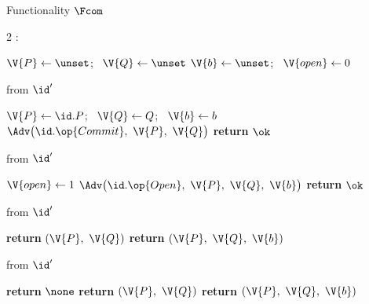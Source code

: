 \begin{interface}[nofloat]{Functionality $\Fcom$ \\
\params{$\PID$, \quad $\Ps$, \quad $\admits$, \quad
$\uses := \{(\Adv,\serves)\}$, \quad $\pars := \none$}}

{\scriptsize
\setlength{\columnsep}{1.4em}
\begin{multicols}{2}
:
\begin{algorithmic}[1]
\setcounter{contline}{0}\algcont
\State $\V{P} \gets \unset$; \ $\V{Q} \gets \unset$
\State $\V{b} \gets \unset$; \ $\V{open} \gets 0$
\algsave
\end{algorithmic}
\vspace{1.4ex}

 \quad from $\id'$
\begin{algorithmic}[1]
\algcont
{} \label{ln:comonce}
\State $\V{P} \gets \id.P$; \ $\V{Q} \gets Q$; \ $\V{b} \gets b$
\State $\Adv\bigl(\id.\op{Commit},\ \V{P},\ \V{Q}\bigr)$ \label{ln:comreceipt}
\State \textbf{return} $\ok$
\algsave
\end{algorithmic}
\vspace{1.4ex}

 \quad from $\id'$
\begin{algorithmic}[1]
\algcont
{} \label{ln:comopener}
\State $\V{open} \gets 1$
\State $\Adv\bigl(\id.\op{Open},\ \V{P},\ \V{Q},\ \V{b}\bigr)$
\State \textbf{return} $\ok$
\algsave
\end{algorithmic}
\vspace{1.4ex}

\columnbreak

 \quad from $\id'$
\begin{algorithmic}[1]
\algcont
{}
  \State \textbf{return} $(\V{P},\ \V{Q})$ \label{ln:comhide}
\EndIf
\State \textbf{return} $(\V{P},\ \V{Q},\ \V{b})$ \label{ln:combind}
\algsave
\end{algorithmic}
\vspace{1.4ex}

 \quad from $\id'$
\begin{algorithmic}[1]
\algcont
{}
  \State \textbf{return} $\none$
\EndIf
{}
  \State \textbf{return} $(\V{P},\ \V{Q})$ \label{ln:comleakhide}
\EndIf
\State \textbf{return} $(\V{P},\ \V{Q},\ \V{b})$
\algsave
\end{algorithmic}
\end{multicols}}
\end{interface}
